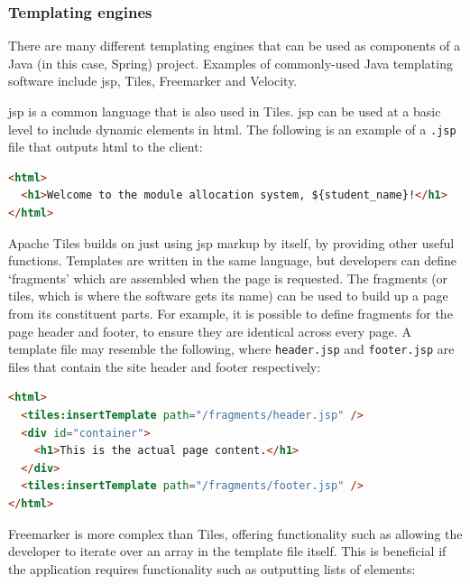 \documentclass[]{scrartcl}
\begin{document}
\subsubsection{Templating engines}


There are many different templating engines that can be used as components of
a Java (in this case, Spring) project. Examples of commonly-used Java
templating software include \gls{jsp}, Tiles, Freemarker and Velocity.


\gls{jsp} is a common language that is also used in Tiles. \gls{jsp} can be
used at a basic level to include dynamic elements in \gls{html}. The following
is an example of a \texttt{.jsp} file that outputs \gls{html} to the client:

\begin{lstlisting}[language=HTML]
<html>
  <h1>Welcome to the module allocation system, ${student_name}!</h1>
</html>
\end{lstlisting}


Apache Tiles builds on just using \gls{jsp} markup by itself, by providing
other useful functions. Templates are written in the same language, but
developers can define `fragments' which are assembled when the page is
requested. The fragments (or tiles, which is where the software gets its name)
can be used to build up a page from its constituent parts. For example, it is
possible to define fragments for the page header and footer, to ensure they
are identical across every page. A template file may resemble the following,
where \texttt{header.jsp} and \texttt{footer.jsp} are files that contain the
site header and footer respectively:

\begin{lstlisting}[language=HTML]
<html>
  <tiles:insertTemplate path="/fragments/header.jsp" />
  <div id="container">
    <h1>This is the actual page content.</h1>
  </div>
  <tiles:insertTemplate path="/fragments/footer.jsp" />
</html>
\end{lstlisting}


Freemarker is more complex than Tiles, offering functionality such as allowing
the developer to iterate over an array in the template file itself. This is
beneficial if the application requires functionality such as outputting lists
of elements:
\end{document}
